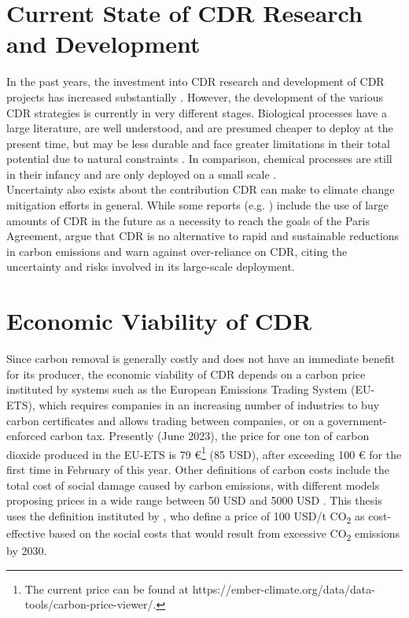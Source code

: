 \section{Current State of CDR Research and Development}
In the past years, the investment into CDR research and development of CDR projects has increased substantially \parencite{Smith2023TheEdition}. However, the development of the various CDR strategies is currently in very different stages. Biological processes have a large literature, are well understood, and are presumed cheaper to deploy at the present time, but may be less durable and face greater limitations in their total potential due to natural constraints \parencite{Fuss2018NegativeEffects}. In comparison, chemical processes are still in their infancy and are only deployed on a small scale \parencite{Smith2023TheEdition}.\\
Uncertainty also exists about the contribution CDR can make to climate change mitigation efforts in general. While some reports (e.g. \textcite{NAS2018NegativeAgenda}) include the use of large amounts of CDR in the future as a necessity to reach the goals of the Paris Agreement, \textcite{Fuss2018NegativeEffects} argue that CDR is no alternative to rapid and sustainable reductions in carbon emissions and warn against over-reliance on CDR, citing the uncertainty and risks involved in its large-scale deployment.\\
\section{Economic Viability of CDR}
Since carbon removal is generally costly and does not have an immediate benefit for its producer, the economic viability of CDR depends on a carbon price instituted by systems such as the European Emissions Trading System (EU-ETS), which requires companies in an increasing number of industries to buy carbon certificates and allows trading between companies, or on a government-enforced carbon tax. Presently (June 2023), the price for one ton of carbon dioxide produced in the EU-ETS is 79 €\footnote{The current price can be found at https://ember-climate.org/data/data-tools/carbon-price-viewer/.} (85 USD), after exceeding 100 € for the first time in February of this year. Other definitions of carbon costs include the total cost of social damage caused by carbon emissions, with different models proposing prices in a wide range between 50 USD and 5000 USD \parencite{Kikstra2021TheVariability}. This thesis uses the definition instituted by \textcite{Griscom2017NaturalSolutions}, who define a price of 100 USD/t CO\textsubscript{2} as cost-effective based on the social costs that would result from excessive CO\textsubscript{2} emissions by 2030.